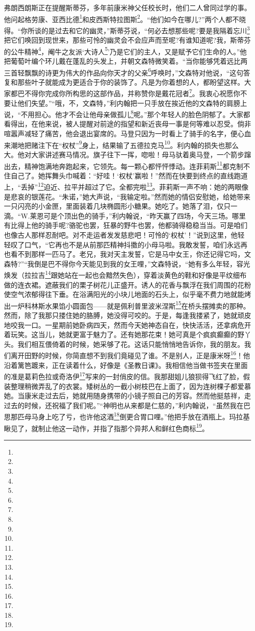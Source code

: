 \par 弗朗西朗斯正在提醒斯蒂芬，多年前康米神父任校长时，他们二人曾同过学的事。他问起格劳康、亚西比德\footnote{}和皮西斯特拉图斯\footnote{}。“他们如今在哪儿?”两个人都不晓得。“你所谈的是过去和它的幽灵，”斯蒂芬说，“何必去想那些呢?要是我隔着忘川\footnote{}把它们唤回到现世来，那些可怜的幽灵会不会应声而至呢?有谁知道呢?我，斯蒂芬的公牛精神\footnote{}，阉牛之友派‘大诗人\footnote{}’乃是它们的主人，又是赋予它们生命的人。”他把葡萄叶编个环儿戴在蓬乱的头发上，并朝文森特微笑着。“当你能够凭着远比两三首轻飘飘的诗更为伟大的作品向你天才的父亲\footnote{}呼唤时，”文森特对他说，“这句答复和那些叶子就能成为更适合于你的装饰了。凡是为你着想的人，都盼望这样。大家都巴不得你完成你所构思的这部作品，并称赞你是戴花冠者\footnote{}。我衷心祝愿你不要让他们失望。”“哦，不，文森特，”利内翰把一只手放在挨近他的文森特的肩膀上说，“不用担心。他才不会让他母亲做孤儿\footnote{}呢。”那个年轻人的脸色阴郁了。大家都看得出，在他来说，被人提醒对前途的指望和新近丧母一事是何等难以忍受。倘非喧嚣声减轻了痛苦，他会退出宴席的。马登只因为一时看上了骑手的名字，便心血来潮地把赌注下在“权杖”\footnote{}身上，结果输了五德拉克马\footnote{}。利内翰的损失也那么大。他对大家讲述赛马情况。旗子往下一挥，唿啦！母马驮着奥马登，一个箭步蹿出去，精神饱满地奔跑起来，它领先。每一颗心都怦怦悸动。连菲莉斯\footnote{}都克制不住自己了。她挥舞头巾喊着：“好哇！‘权杖’赢啦！”然而在快要到终点的直线跑道上，“丢掉”\footnote{}迫近、拉平并超过了它。全都完啦\footnote{}。菲莉斯一声不响：她的两眼像是悲哀的银莲花。“朱诺，”她大声说，“我输定啦。”然而她的情侣安慰她，给她带来一只闪亮的小金匣，里面装着几块椭圆形小糖果。她吃了。她落了泪，仅只一滴。“W.莱恩可是个顶出色的骑手，”利内翰说，“昨天赢了四场，今天三场。哪里有比得上他的骑手呢?骆驼也罢，狂暴的野牛也罢，他都骑得稳稳当当。可是咱们也像古人那样忍耐吧。对不走运者发发慈悲吧！可怜的‘权杖’！”说到这里，他轻轻叹了口气，“它再也不是从前那匹精神抖擞的小母马啦。我敢发誓，咱们永远再也看不到那样一匹马了。老兄，我对天主发誓，它是马中女王，你还记得它吗，文森特?”“我倒是巴不得你今天能见到我的女王哩，”文森特说，“她有多么年轻，容光焕发（拉拉吉\footnote{}跟她站在一起也会黯然失色），穿着淡黄色的鞋和好像是平纹细布做的连衣裙。遮蔽我们的栗子树花儿正盛开。诱人的花香与飘浮在我们周围的花粉使空气浓郁得往下垂。在浴满阳光的小块儿地面的石头上，似乎毫不费力地就能烤出一炉科林斯水果馅小圆面包——就是佩利普里波米涅斯\footnote{}在桥头摆摊卖的那种。然而，除了我那只搂住她的胳膊，她没得可咬的。于是，每逢我搂紧了，她就顽皮地咬我一口。一星期前她卧病四天，然而今天她神态自在，快快活活，还拿病危开着玩笑。这当儿，她就更富于魅力了。还有她那花束！她可真是个疯疯癫癫的野丫头。我们相互偎倚着的时候，她采够了花。这话只能悄悄地告诉你，我的朋友。我们离开田野的时候，你简直想不到我们竟碰见了谁。不是别人，正是康米呀\footnote{}！他沿着篱笆踱来，正在读着什么，好像是《圣教日课》。我相信他当做书签夹在里面的准是葛莉色拉或奇洛伊\footnote{}写来的一封俏皮的信。我那甜姐儿狼狈得飞红了脸，假装整理稍微弄乱了的衣裳。矮树丛的一截小树枝巴在上面了，因为连树棵子都爱慕她。当康米走过去后，她就用随身携带的小镜子照自己的芳容。然而他挺慈祥，走过去的时候，还祝福了我们呢。”“神明也从来都是仁慈的，”利内翰说，“虽然我在巴思那匹母马身上吃了亏，也许他这酒\footnote{}倒更合胃口哩。”他把手放在酒瓶上。玛拉基瞅见了，就制止他这一动作，并指了指那个异邦人和鲜红色商标\footnote{}。